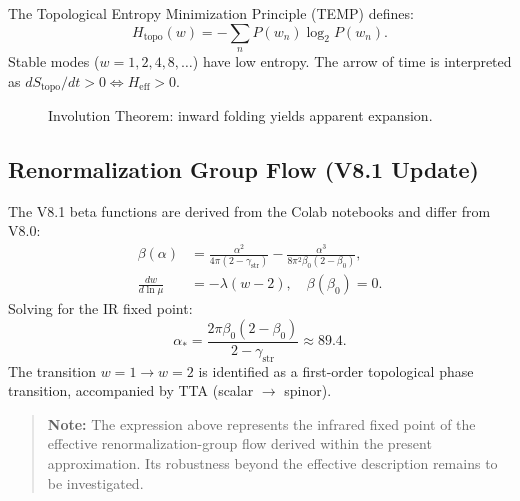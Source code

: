 \documentclass[12pt,a4paper]{article}
\numberwithin{equation}{section}
\begin{document}
The Topological Entropy Minimization Principle (TEMP) defines:
\begin{equation}
H_{\text{topo}}(w) = -\sum_n P(w_n) \log_2 P(w_n).
\end{equation}
Stable modes ($w=1,2,4,8,\dots$) have low entropy. The arrow of time is interpreted as $dS_{\text{topo}}/dt > 0 \iff H_{\text{eff}} > 0$.

\begin{figure}[h]
\centering
{}
\caption{Involution Theorem: inward folding yields apparent expansion.}
\label{fig:involution}
\end{figure}

\subsection{Renormalization Group Flow (V8.1 Update)}

The V8.1 beta functions are derived from the Colab notebooks and differ from V8.0:
\begin{align}
\beta(\alpha) &= \frac{\alpha^2}{4\pi(2-\gamma_{\text{str}})} - \frac{\alpha^3}{8\pi^2 \beta_0(2-\beta_0)}, \\
\frac{dw}{d\ln \mu} &= -\lambda (w - 2), \quad \beta(\beta_0) = 0.
\end{align}
Solving for the IR fixed point:
\begin{equation}
\alpha_* = \frac{2\pi \beta_0(2-\beta_0)}{2-\gamma_{\text{str}}} \approx 89.4.
\end{equation}
The transition $w=1 \to w=2$ is identified as a first-order topological phase transition, accompanied by TTA (scalar $\to$ spinor).

\begin{quote}
\textbf{Note:} The expression above represents the infrared fixed point of the effective renormalization-group flow derived within the present approximation. Its robustness beyond the effective description remains to be investigated.
\end{quote}
\end{document}
